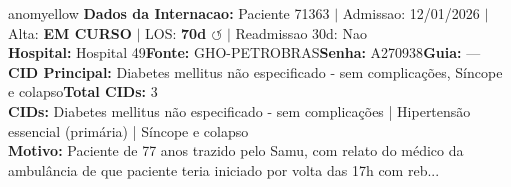 \documentclass[a4paper,10pt]{article}
\begin{document}
\newpage

\begin{anomalycard}[Internacao 161788 | GHO-PETROBRAS | MODERADO (z=2.01)]{anomyellow}
\textbf{Dados da Internacao:} Paciente 71363 $\mid$ Admissao: 12/01/2026 $\mid$ Alta: \textcolor{anomorange}{\textbf{EM CURSO}} $\mid$ LOS: \textbf{70d \textcolor{anomorange}{$\circlearrowleft$}} $\mid$ Readmissao 30d: Nao\\
\textbf{Hospital:} Hospital 49\quad\textbf{Fonte:} GHO-PETROBRAS\quad\textbf{Senha:} A270938\quad\textbf{Guia:} ---\\
\textbf{CID Principal:} {\small Diabetes mellitus não especificado - sem complicações, Síncope e colapso}\quad\textbf{Total CIDs:} 3\\

\textbf{CIDs:} {\scriptsize Diabetes mellitus não especificado - sem complicações | Hipertensão essencial (primária) | Síncope e colapso}\\

\textbf{Motivo:} {\scriptsize Paciente de 77 anos trazido pelo Samu, com relato do médico da ambulância de que paciente teria iniciado por volta das 17h com reb...}\\


\end{anomalycard}
\end{document}
